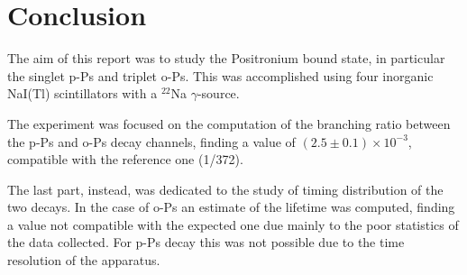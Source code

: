 \section*{Conclusion}
The aim of this report was to study the Positronium bound state, in particular the singlet p-Ps and triplet o-Ps. This was accomplished using four inorganic NaI(Tl) scintillators with a $^{22}$Na $\gamma$-source.

The experiment was focused on the computation of the branching ratio between the p-Ps and o-Ps decay channels, finding a value of  $(2.5\pm0.1)\times 10^{-3}$,  compatible with the reference one (1/372).  

The last part, instead, was dedicated to the study of timing distribution of the two decays. In the case of  o-Ps an estimate of the lifetime was computed, finding a value not compatible with the expected one due mainly to the poor statistics of the data collected. For p-Ps decay this was not possible due to the time resolution of the apparatus. 